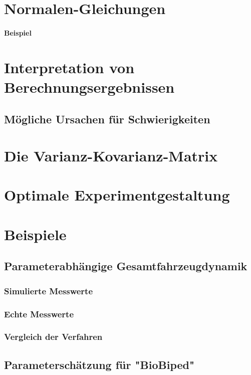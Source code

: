 	\section{Normalen-Gleichungen} %

		\paragraph{Beispiel} %

	\section{Interpretation von Berechnungsergebnissen} %

		\subsection{Mögliche Ursachen für Schwierigkeiten} %

	\section{Die Varianz-Kovarianz-Matrix} %

	\section{Optimale Experimentgestaltung} %

	\section{Beispiele} %

		\subsection{Parameterabhängige Gesamtfahrzeugdynamik} %

			\subsubsection{Simulierte Messwerte} %

			\subsubsection{Echte Messwerte} %

			\subsubsection{Vergleich der Verfahren} %

		\subsection{Parameterschätzung für "BioBiped"} %
